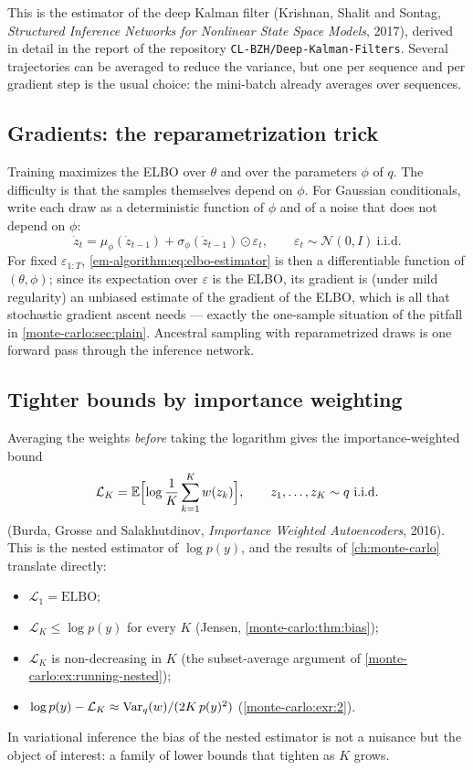 \begin{notechapter}
This is the estimator of the deep Kalman filter (Krishnan, Shalit and Sontag,
\emph{Structured Inference Networks for Nonlinear State Space Models}, 2017),
derived in detail in the report of the repository \texttt{CL-BZH/Deep-Kalman-Filters}.
Several trajectories can be averaged to reduce the variance, but one per sequence
and per gradient step is the usual choice: the mini-batch already averages over
sequences.

\subsection{Gradients: the reparametrization trick}

Training maximizes the ELBO over $\theta$ and over the parameters $\phi$ of $q$. The
difficulty is that the samples themselves depend on $\phi$. For Gaussian
conditionals, write each draw as a deterministic function of $\phi$ and of a noise
that does not depend on $\phi$:
\[
  \dot z_t = \mu_\phi(\dot z_{t-1}) + \sigma_\phi(\dot z_{t-1})\odot\varepsilon_t,\qquad
  \varepsilon_t\sim\mathcal N(0, I)\ \text{i.i.d.}
\]
For fixed $\varepsilon_{1:T}$, \cref{em-algorithm:eq:elbo-estimator} is then a
differentiable function of $(\theta,\phi)$; since its expectation over $\varepsilon$ is
the ELBO, its gradient is (under mild regularity) an unbiased estimate of the
gradient of the ELBO, which is all that stochastic gradient ascent needs --- exactly
the one-sample situation of the pitfall in \cref{monte-carlo:sec:plain}. Ancestral
sampling with reparametrized draws is one forward pass through the inference
network.

\subsection{Tighter bounds by importance weighting}

Averaging the weights \emph{before} taking the logarithm gives the
importance-weighted bound
\[
  \mathcal L_K = \E\Bigl[\log\frac1K\sum_{k=1}^Kw(z_k)\Bigr],\qquad z_1,\dots,z_K\sim q\ \text{i.i.d.}
\]
(Burda, Grosse and Salakhutdinov, \emph{Importance Weighted Autoencoders}, 2016). This
is the nested estimator of $\log p(y)$, and the results of \cref{ch:monte-carlo}
translate directly:
\begin{itemize}[nosep]
  \item $\mathcal L_1 = \mathrm{ELBO}$;
  \item $\mathcal L_K\leq\log p(y)$ for every $K$ (Jensen, \cref{monte-carlo:thm:bias});
  \item $\mathcal L_K$ is non-decreasing in $K$ (the subset-average argument of
        \cref{monte-carlo:ex:running-nested});
  \item $\log p(y) - \mathcal L_K\approx\operatorname{Var}_q(w)/(2K\,p(y)^2)$ (\cref{monte-carlo:exr:2}).
\end{itemize}
In variational inference the bias of the nested estimator is not a nuisance but the
object of interest: a family of lower bounds that tighten as $K$ grows.


\end{notechapter}
